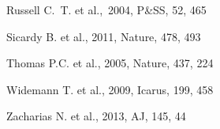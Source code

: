 \documentclass[useAMS,usenatbib]{mn2e}
\begin{document}
\begin{thebibliography}{99}

 Russell C.~T. et al.,\ 2004, P\&SS, 52, 465 


 Sicardy B. et al., 2011,
Nature, 478, 493

 Thomas P.C. et al., 2005,
Nature, 437, 224


 Widemann T. et al., 2009,
Icarus, 199, 458


 Zacharias N. et al., 2013,
AJ, 145, 44



\end{thebibliography}




\label{lastpage}
\end{document}
